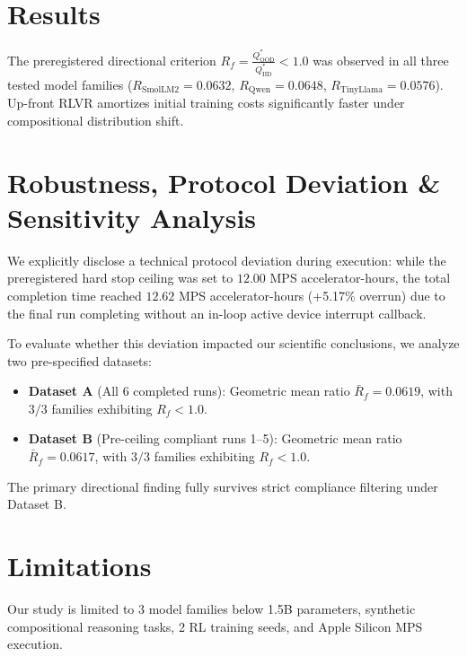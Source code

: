 \documentclass{article}
\begin{document}
\section{Results}
The preregistered directional criterion $R_f = \frac{Q^*_{\text{OOD}}}{Q^*_{\text{IID}}} < 1.0$ was observed in all three tested model families ($R_{\text{SmolLM2}} = 0.0632$, $R_{\text{Qwen}} = 0.0648$, $R_{\text{TinyLlama}} = 0.0576$). Up-front RLVR amortizes initial training costs significantly faster under compositional distribution shift.

\section{Robustness, Protocol Deviation \& Sensitivity Analysis}
We explicitly disclose a technical protocol deviation during execution: while the preregistered hard stop ceiling was set to $12.00$ MPS accelerator-hours, the total completion time reached $12.62$ MPS accelerator-hours (+5.17\% overrun) due to the final run completing without an in-loop active device interrupt callback.

To evaluate whether this deviation impacted our scientific conclusions, we analyze two pre-specified datasets:
\begin{itemize}
    \item \textbf{Dataset A} (All 6 completed runs): Geometric mean ratio $\bar{R}_f = 0.0619$, with $3/3$ families exhibiting $R_f < 1.0$.
    \item \textbf{Dataset B} (Pre-ceiling compliant runs 1--5): Geometric mean ratio $\bar{R}_f = 0.0617$, with $3/3$ families exhibiting $R_f < 1.0$.
\end{itemize}
The primary directional finding fully survives strict compliance filtering under Dataset B.

\section{Limitations}
Our study is limited to 3 model families below 1.5B parameters, synthetic compositional reasoning tasks, 2 RL training seeds, and Apple Silicon MPS execution.



\end{document}
